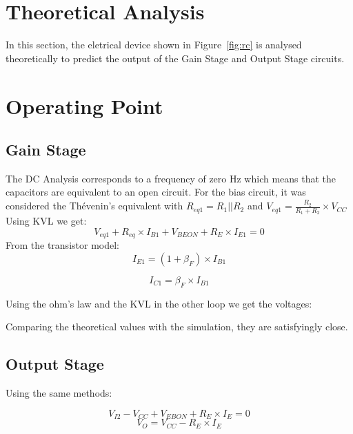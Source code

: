 \section{Theoretical Analysis}
\label{sec:analysis}

In this section, the eletrical device shown in Figure~\ref{fig:rc} is analysed
theoretically to predict the output of the Gain Stage and Output Stage circuits.

\section{Operating Point}

\subsection{Gain Stage}
The DC Analysis corresponds to a frequency of zero Hz which means that the capacitors are equivalent to an open circuit.
For the bias circuit, it was considered the Thévenin’s equivalent with $R_{eq1}=R_{1}||R_{2}$ and $V_{eq1}=\frac{R_{2}}{R_{1}+R_{2}}\times V_{CC}$
Using KVL we get:
\begin{equation}
  V_{eq1} + R_{eq}\times I_{B1} + V_{BEON} + R_{E}\times I_{E1}  = 0
  \label{eq:kvl}
\end{equation}
From the transistor model:
\begin{equation}
  I_{E1} = (1+\beta_{F})\times I_{B1}
  \label{eq:IE}
\end{equation}

\begin{equation}
  I_{C1} = \beta_{F}\times I_{B1}
  \label{eq:IE}
\end{equation}

Using the ohm's law and the KVL in the other loop we get the voltages:



Comparing the theoretical values with the simulation, they are satisfyingly close.
\subsection{Output Stage}
Using the same methods:

\begin{equation}
  V_{I2} - V_{CC} + V_{EBON} + R_{E}\times I_{E}  = 0
  \label{eq:kvl}
\end{equation}
\begin{equation}
  V_{O} = V_{CC} - R_{E}\times I_{E}
  \label{eq:VO}
\end{equation}

